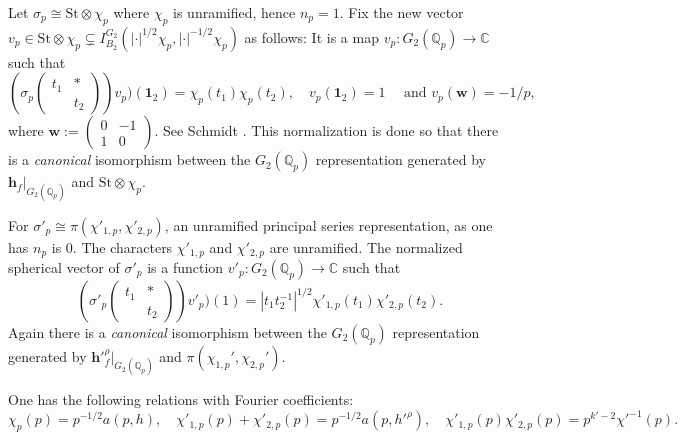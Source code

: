 \documentclass[11pt]{amsart}
\begin{document}
Let $\sigma_p \cong \text{St}\otimes \chi_p$ where $\chi_p$ is unramified, hence $n_p =1 $. Fix the new vector 
$v_p \in\text{St}\otimes \chi_p \subsetneq  I_{B_2}^{G_2}(|\cdot|^{1/2}\chi_p, |\cdot |^{-1/2}\chi_p)$ as follows: 
It is a map $v_p : G_2(\mathbb{Q}_p) \rightarrow \mathbb{C}$ such that 
\begin{equation}
\left(\sigma_p \left(\begin{smallmatrix} t_1 & * \\ & t_2 \end{smallmatrix}\right)\right) v_p)(\mathbf{1}_2) = \chi_p(t_1) \chi_p(t_2), \quad 
v_p(\mathbf{1}_2) = 1 \quad \text{ and } v_p(\mathbf{w}) = -1/p, 
\end{equation}
where $\mathbf{w} := \left(\begin{smallmatrix}  0 & -1 \\ 1 & 0 \end{smallmatrix}\right).$ See Schmidt \cite[Sect.\,2.1]{ralf-schmidt}. 
This normalization is done so that there is a \textit{canonical} isomorphism between the $G_2(\mathbb{Q}_p)$ representation generated by $\mathbf{h}_f|_{G_2(\mathbb{Q}_p)}$ and $\text{St}\otimes \chi_p.$ 

\smallskip

For $\sigma'_p \cong \pi(\chi'_{1,p}, \chi'_{2,p})$, an unramified principal series representation, as one has $n_p$ is $0$. 
The characters $\chi'_{1,p}$ and $ \chi'_{2,p}$ are unramified.
The normalized spherical vector of $\sigma'_p$ is a function $v'_p : G_2(\mathbb{Q}_p) \rightarrow \mathbb{C}$ such that
\begin{equation}
	\left(\sigma'_p \left(\begin{smallmatrix} t_1 & * \\ & t_2 \end{smallmatrix}\right)\right) v'_p)(1) = |t_1 t_2^{-1}|^{1/2} \chi'_{1,p}(t_1) \chi'_{2,p}(t_2).
\end{equation}
Again there is a \textit{canonical} isomorphism between the $G_2(\mathbb{Q}_p)$ representation generated by $\mathbf{h}'^\rho_f|_{G_2(\mathbb{Q}_p)}$ and $\pi(\chi_{1,p}', \chi_{2,p}').$

One has the following relations with Fourier coefficients: 
\begin{equation} \label{eqn: relation-with-fourier-coefficient}
\chi_p(p) = p^{-1/2}a(p,h), \quad \chi'_{1,p}(p) + \chi'_{2,p}(p) = p^{-1/2} a(p,h'^\rho) , \quad \chi'_{1,p}(p)\chi'_{2,p}(p) = p^{k'-2}\chi'^{-1}(p).
\end{equation}
\end{document}
